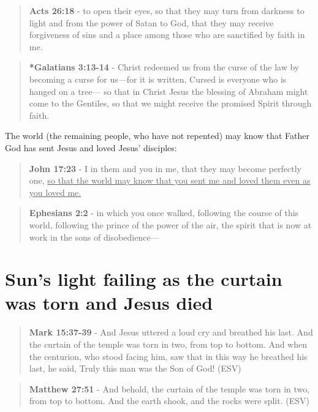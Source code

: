 \documentclass[11pt]{article}
\begin{document}
\begin{quote}
\textbf{Acts 26:18} - to open their eyes, so that they may turn from darkness to light and from the power of Satan to God, that they may receive forgiveness of sins and a place among those who are sanctified by faith in me.
\end{quote}

\begin{quote}
\textbf{*Galatians 3:13-14} - Christ redeemed us from the curse of the law by becoming a curse for us—for it is written, Cursed is everyone who is hanged on a tree— so that in Christ Jesus the blessing of Abraham might come to the Gentiles, so that we might receive the promised Spirit through faith.
\end{quote}

The world (the remaining people, who have not repented) may know that Father God has sent Jesus and loved Jesus' disciples:

\begin{quote}
\textbf{John 17:23} - I in them and you in me, that they may become perfectly one, \uline{so that the world may know that you sent me and loved them even as you loved me.}
\end{quote}

\begin{quote}
\textbf{Ephesians 2:2} - in which you once walked, following the course of this world, following the prince of the power of the air, the spirit that is now at work in the sons of disobedience—
\end{quote}

\section{Sun's light failing as the curtain was torn and Jesus died}
\label{sec:org01288f7}
\begin{quote}
\textbf{Mark 15:37-39} - And Jesus uttered a loud cry and breathed his last. And the curtain of the temple was torn in two, from top to bottom. And when the centurion, who stood facing him, saw that in this way he breathed his last, he said, Truly this man was the Son of God! (ESV)
\end{quote}

\begin{quote}
\textbf{Matthew 27:51} - And behold, the curtain of the temple was torn in two, from top to bottom. And the earth shook, and the rocks were split. (ESV)
\end{quote}
\end{document}
